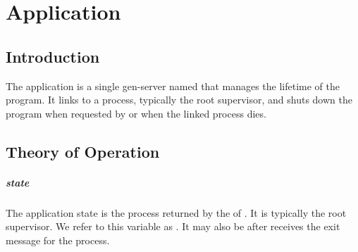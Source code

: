 %
%
%

\chapter {Application}\label{chap:application}

\section {Introduction}

The application is a single gen-server named
 that manages the lifetime of the program.  It
links to a process, typically the root supervisor, and shuts down the
program when requested by  or when the
linked process dies.

\section {Theory of Operation}

\paragraph* {state}
The application state is the process returned by the  of
. It is typically the root supervisor. We
refer to this variable as . It may also be 
after  receives the exit message for the process.

